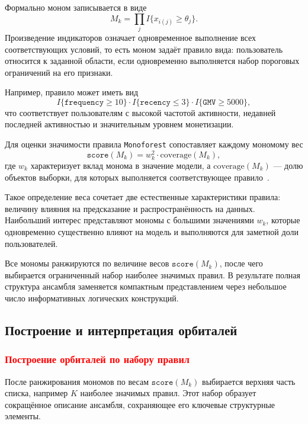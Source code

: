 Формально моном записывается в виде
\begin{equation}
    M_k = \prod_j I\{x_{i(j)} \ge \theta_j\}.
\end{equation}
Произведение индикаторов означает одновременное выполнение всех
соответствующих условий, то есть моном задаёт правило вида: пользователь
относится к заданной области, если одновременно выполняется набор
пороговых ограничений на его признаки.

Например, правило может иметь вид
\[
I\{\texttt{frequency} \ge 10\} \cdot
I\{\texttt{recency} \le 3\} \cdot
I\{\texttt{GMV} \ge 5000\},
\]
что соответствует пользователям с высокой частотой активности, недавней
последней активностью и значительным уровнем монетизации.

Для оценки значимости правила \texttt{Monoforest} сопоставляет каждому мономому
вес
\begin{equation}
    \texttt{score}(M_k) = w_k^2 \cdot \mathrm{coverage}(M_k),
\end{equation}
где \(w_k\) характеризует вклад монома в значение модели, а
\(\mathrm{coverage}(M_k)\) — долю объектов выборки, для которых
выполняется соответствующее правило~\cite{monoforest}.

Такое определение веса сочетает две естественные характеристики
правила: величину влияния на предсказание и распространённость на
данных. Наибольший интерес представляют мономы с большими значениями
\(w_k\), которые одновременно существенно влияют на модель и выполняются
для заметной доли пользователей.

Все мономы ранжируются по величине весов \(\texttt{score}(M_k)\), после чего выбирается
ограниченный набор наиболее значимых правил. В результате полная
структура ансамбля заменяется компактным представлением через небольшое
число информативных логических конструкций.

\subsection{Построение и интерпретация орбиталей}
\label{subsec:orbital_interpretation}

\subsubsection{\textcolor{red}{Построение орбиталей по набору правил}}
\label{subsubsec:orbital_derivation}

После ранжирования мономов по весам \(\texttt{score}(M_k)\) выбирается верхняя часть
списка, например \(K\) наиболее значимых правил. Этот набор образует
сокращённое описание ансамбля, сохраняющее его ключевые структурные
элементы.

